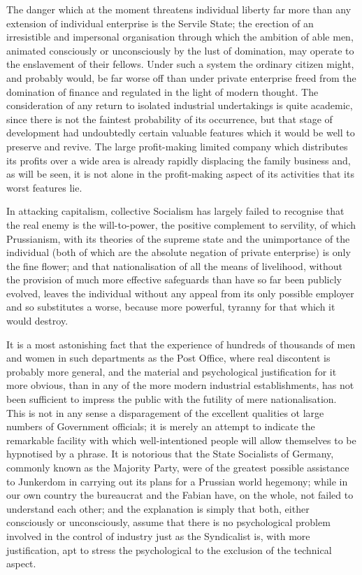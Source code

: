 \documentclass{book}
\begin{document}
The danger which at the moment threatens individual liberty far more than any extension of individual enterprise is the Servile State; the erection of an irresistible and impersonal organisation through which the ambition of able men, animated consciously or unconsciously by the lust of domination, may operate to the enslavement of their fellows. Under such a system the ordinary citizen might, and probably would, be far worse off than under private enterprise freed from the domination of finance and regulated in the light of modern thought. The consideration of any return to isolated industrial undertakings is quite academic, since there is not the faintest probability of its occurrence, but that stage of development had undoubtedly certain valuable features which it would be well to preserve and revive. The large profit-making limited company which distributes its profits over a wide area is already rapidly displacing the family business and, as will be seen, it is not alone in the profit-making aspect of its activities that its worst features lie.

In attacking capitalism, collective Socialism has largely failed to recognise that the real enemy is the will-to-power, the positive complement to servility, of which Prussianism, with its theories of the supreme state and the unimportance of the individual (both of which are the absolute negation of private enterprise) is only the fine flower; and that nationalisation of all the means of livelihood, without the provision of much more effective safeguards than have so far been publicly evolved, leaves the individual without any appeal from its only possible employer and so substitutes a worse, because more powerful, tyranny for that which it would destroy.

It is a most astonishing fact that the experience of hundreds of thousands of men and women in such departments as the Post Office, where real discontent is probably more general, and the material and psychological justification for it more obvious, than in any of the more modern industrial establishments, has not been sufficient to impress the public with the futility of mere nationalisation. This is not in any sense a disparagement of the excellent qualities ot large numbers of Government officials; it is merely an attempt to indicate the remarkable facility with which well-intentioned people will allow themselves to be hypnotised by a phrase. It is notorious that the State Socialists of Germany, commonly known as the Majority Party, were of the greatest possible assistance to Junkerdom in carrying out its plans for a Prussian world hegemony; while in our own country the bureaucrat and the Fabian have, on the whole, not failed to understand each other; and the explanation is simply that both, either consciously or unconsciously, assume that there is no psychological problem involved in the control of industry just as the Syndicalist is, with more justification, apt to stress the psychological to the exclusion of the technical aspect.
\end{document}
